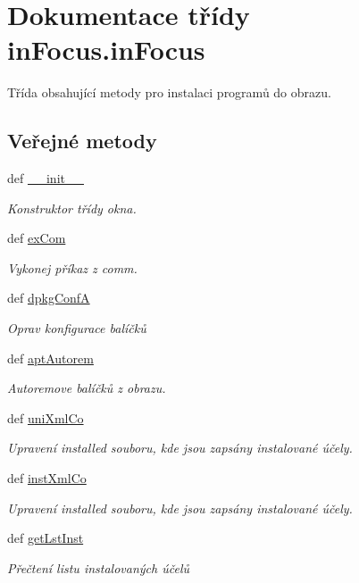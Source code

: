 \hypertarget{classinFocus_1_1inFocus}{\section{Dokumentace třídy in\-Focus.\-in\-Focus}
\label{d3/d33/classinFocus_1_1inFocus}
}


Třída obsahující metody pro instalaci programů do obrazu.  


\subsection*{Veřejné metody}
\begin{DoxyCompactItemize}
\item 
def \hyperlink{classinFocus_1_1inFocus_ac06f16bae334520e5c694b44bd2b1826}{\-\_\-\-\_\-init\-\_\-\-\_\-}
\begin{DoxyCompactList}\small\item\em Konstruktor třídy okna. \end{DoxyCompactList}\item 
def \hyperlink{classinFocus_1_1inFocus_a90c0fe90323d95c8f49e138c77d10cdf}{ex\-Com}
\begin{DoxyCompactList}\small\item\em Vykonej příkaz z comm. \end{DoxyCompactList}\item 
def \hyperlink{classinFocus_1_1inFocus_ad9f1d2f40a345051f143e7d9e7b534ab}{dpkg\-Conf\-A}
\begin{DoxyCompactList}\small\item\em Oprav konfigurace balíčků \end{DoxyCompactList}\item 
def \hyperlink{classinFocus_1_1inFocus_aed0d44b93cad2d1f8779b1ede9755a4f}{apt\-Autorem}
\begin{DoxyCompactList}\small\item\em Autoremove balíčků z obrazu. \end{DoxyCompactList}\item 
def \hyperlink{classinFocus_1_1inFocus_a64cbd33ed3dcf62bb6ab44de37cddba1}{uni\-Xml\-Co}
\begin{DoxyCompactList}\small\item\em Upravení installed souboru, kde jsou zapsány instalované účely. \end{DoxyCompactList}\item 
def \hyperlink{classinFocus_1_1inFocus_ad8ae29f519ec260560e3f3f33076add3}{inst\-Xml\-Co}
\begin{DoxyCompactList}\small\item\em Upravení installed souboru, kde jsou zapsány instalované účely. \end{DoxyCompactList}\item 
def \hyperlink{classinFocus_1_1inFocus_af6094d372c354e903a9c9e12eed838e0}{get\-Lst\-Inst}
\begin{DoxyCompactList}\small\item\em Přečtení listu instalovaných účelů \end{DoxyCompactList}\end{DoxyCompactItemize}
